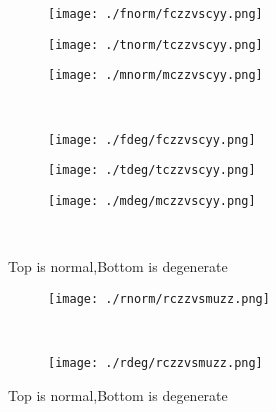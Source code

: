 \documentclass[aps,floats,floatfix,nofootinbib]{revtex4-1}
\begin{document}
\begin{center}
\begin{figure}
\begin{subfigure}{0.3\textwidth}
\texttt{[image: ./fnorm/fczzvscyy.png]}
\label{}
\end{subfigure}
\begin{subfigure}{0.3\textwidth}
\texttt{[image: ./tnorm/tczzvscyy.png]}
\label{}
\end{subfigure}
\begin{subfigure}{0.3\textwidth}
\texttt{[image: ./mnorm/mczzvscyy.png]}
\label{}
\end{subfigure}\\
\begin{subfigure}{0.3\textwidth}
\texttt{[image: ./fdeg/fczzvscyy.png]}
\label{}
\end{subfigure}
\begin{subfigure}{0.3\textwidth}
\texttt{[image: ./tdeg/tczzvscyy.png]}
\label{}
\end{subfigure}
\begin{subfigure}{0.3\textwidth}
\texttt{[image: ./mdeg/mczzvscyy.png]}
\label{}
\end{subfigure}\\
\caption{Top is normal,Bottom is degenerate}
\end{figure}
\end{center}

\begin{center}
\begin{figure}
\begin{subfigure}{0.95\textwidth}
\texttt{[image: ./rnorm/rczzvsmuzz.png]}
\label{}
\end{subfigure}\\
\begin{subfigure}{0.95\textwidth}
\texttt{[image: ./rdeg/rczzvsmuzz.png]}
\label{}
\end{subfigure}
\caption{Top is normal,Bottom is degenerate}
\end{figure}
\end{center}
\end{document}
